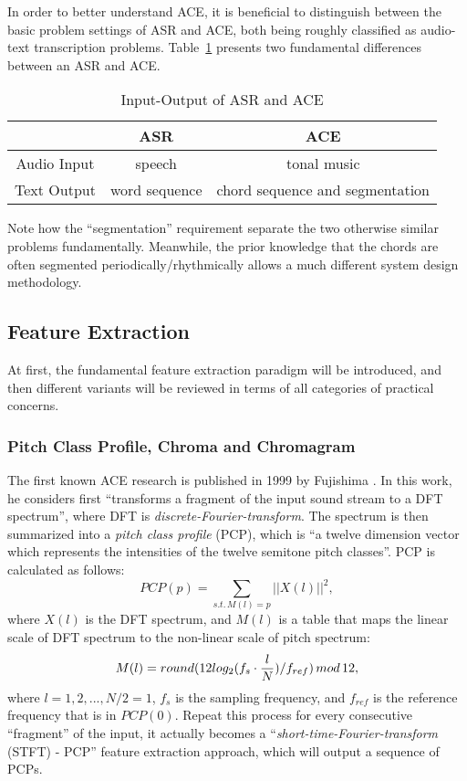 In order to better understand ACE, it is beneficial to distinguish between the basic problem settings of ASR and ACE, both being roughly classified as audio-text transcription problems. Table~\ref{tab:2-asrace} presents two fundamental differences between an ASR and ACE.
\begin{table}
\caption{Input-Output of ASR and ACE}
\centering
\footnotesize
\begin{tabular}{|c|c|c|} \hline
	& ASR & ACE \\ \hline
Audio Input & speech & tonal music \\ \hline
Text Output & word sequence & chord sequence and segmentation \\ \hline
\end{tabular}
\label{tab:2-asrace}
\end{table}
Note how the ``segmentation'' requirement separate the two otherwise similar problems fundamentally. Meanwhile, the prior knowledge that the chords are often segmented periodically/rhythmically allows a much different system design methodology.


\subsection{Feature Extraction} \label{sec:2-fe}
At first, the fundamental feature extraction paradigm will be introduced, and then different variants will be reviewed in terms of all categories of practical concerns.

\subsubsection{Pitch Class Profile, Chroma and Chromagram}
The first known ACE research is published in 1999 by Fujishima \cite{fujishima1999realtime}. In this work, he considers first ``transforms a fragment of the input sound stream to a DFT spectrum'', where DFT is {\it discrete-Fourier-transform}. The spectrum is then summarized into a {\it pitch class profile} (PCP), which is ``a twelve dimension vector which represents the intensities of the twelve semitone pitch classes''. PCP is calculated as follows:
\begin{equation}
PCP(p) = \sum_{s.t.\,M(l)=p}{||X(l)||^2},
\end{equation}
where $X(l)$ is the DFT spectrum, and $M(l)$ is a table that maps the linear scale of DFT spectrum to the non-linear scale of pitch spectrum:
\begin{equation}
M(l) = round(12log_2({f_s} \cdot {l\over N})/f_{ref})\,mod\,12,
\end{equation}
where $l=1,2,...,N/2=1$, $f_s$ is the sampling frequency, and $f_{ref}$ is the reference frequency that is in $PCP(0)$. Repeat this process for every consecutive ``fragment'' of the input, it actually becomes a ``{\it short-time-Fourier-transform} (STFT) - PCP'' feature extraction approach, which will output a sequence of PCPs.

